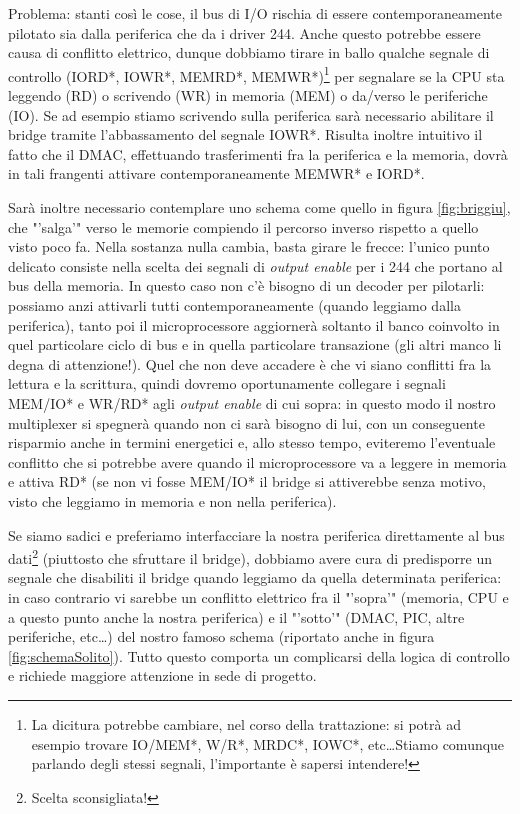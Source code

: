 Problema: stanti così le cose, il bus di I/O rischia di essere contemporaneamente pilotato sia dalla periferica che da i driver 244. Anche questo potrebbe essere causa di conflitto elettrico, dunque dobbiamo tirare in ballo qualche segnale di controllo (IORD*, IOWR*, MEMRD*, MEMWR*)\footnote{La dicitura potrebbe cambiare, nel corso della trattazione: si potrà ad esempio trovare IO/MEM*, W/R*, MRDC*, IOWC*, etc\ldots Stiamo comunque parlando degli stessi segnali, l'importante è sapersi intendere!} per segnalare se la CPU sta leggendo (RD) o scrivendo (WR) in memoria (MEM) o da/verso le periferiche (IO). Se ad esempio stiamo scrivendo sulla periferica sarà necessario abilitare il bridge tramite l'abbassamento del segnale IOWR*. Risulta inoltre intuitivo il fatto che il DMAC, effettuando trasferimenti fra la periferica e la memoria, dovrà in tali frangenti attivare contemporaneamente MEMWR* e IORD*.

Sarà inoltre necessario contemplare uno schema come quello in figura \ref{fig:briggiu}, che "'salga'" verso le memorie compiendo il percorso inverso rispetto a quello visto poco fa. Nella sostanza nulla cambia, basta girare le frecce: l'unico punto delicato consiste nella scelta dei segnali di \textit{output enable } per i 244 che portano al bus della memoria. In questo caso non c'è bisogno di un decoder per pilotarli: possiamo anzi attivarli tutti contemporaneamente (quando leggiamo dalla periferica), tanto poi il microprocessore aggiornerà soltanto il banco coinvolto in quel particolare ciclo di bus e in quella particolare transazione (gli altri manco li degna di attenzione!).
Quel che non deve accadere è che vi siano conflitti fra la lettura e la scrittura, quindi dovremo oportunamente collegare i segnali MEM/IO* e WR/RD* agli \textit{output enable} di cui sopra: in questo modo il nostro multiplexer si spegnerà quando non ci sarà bisogno di lui, con un conseguente risparmio anche in termini energetici e, allo stesso tempo, eviteremo l'eventuale conflitto che si potrebbe avere quando il microprocessore va a leggere in memoria e attiva RD* (se non vi fosse MEM/IO* il bridge si attiverebbe senza motivo, visto che leggiamo in memoria e non nella periferica).

Se siamo sadici e preferiamo interfacciare la nostra periferica direttamente al bus dati\footnote{Scelta sconsigliata!} (piuttosto che sfruttare il bridge), dobbiamo avere cura di predisporre un segnale che disabiliti il bridge quando leggiamo da quella determinata periferica: in caso contrario vi sarebbe un conflitto elettrico fra il "'sopra'" (memoria, CPU e a questo punto anche la nostra periferica) e il "'sotto'" (DMAC, PIC, altre periferiche, etc\ldots) del nostro famoso schema (riportato anche in figura \ref{fig:schemaSolito}). Tutto questo comporta un complicarsi della logica di controllo e richiede maggiore attenzione in sede di progetto.


